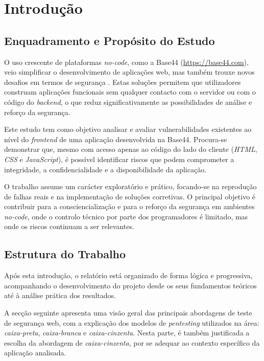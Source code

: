 \section{Introdução}

\subsection{Enquadramento e Propósito do Estudo}

O uso crescente de plataformas \textit{no-code}, como a Base44 (\url{https://base44.com}), veio simplificar o desenvolvimento de aplicações web, mas também trouxe novos desafios em termos de segurança \cite{ref54}. Estas soluções permitem que utilizadores construam aplicações funcionais sem qualquer contacto com o servidor ou com o código do \textit{backend}, o que reduz significativamente as possibilidades de análise e reforço da segurança.

Este estudo tem como objetivo analisar e avaliar vulnerabilidades existentes ao nível do \textit{frontend} de uma aplicação desenvolvida na Base44. Procura-se demonstrar que, mesmo com acesso apenas ao código do lado do cliente (\textit{HTML}, \textit{CSS} e \textit{JavaScript}), é possível identificar riscos que podem comprometer a integridade, a confidencialidade e a disponibilidade da aplicação.

O trabalho assume um carácter exploratório e prático, focando-se na reprodução de falhas reais e na implementação de soluções corretivas. O principal objetivo é contribuir para a consciencialização e para o reforço da segurança em ambientes \textit{no-code}, onde o controlo técnico por parte dos programadores é limitado, mas onde os riscos continuam a ser relevantes.

\subsection{Estrutura do Trabalho}

Após esta introdução, o relatório está organizado de forma lógica e progressiva, acompanhando o desenvolvimento do projeto desde os seus fundamentos teóricos até à análise prática dos resultados.

A secção seguinte apresenta uma visão geral das principais abordagens de teste de segurança web, com a explicação dos modelos de \textit{pentesting} utilizados na área: \textit{caixa-preta}, \textit{caixa-branca} e \textit{caixa-cinzenta}. Nesta parte, é também justificada a escolha da abordagem de \textit{caixa-cinzenta}, por se adequar ao contexto específico da aplicação analisada.

